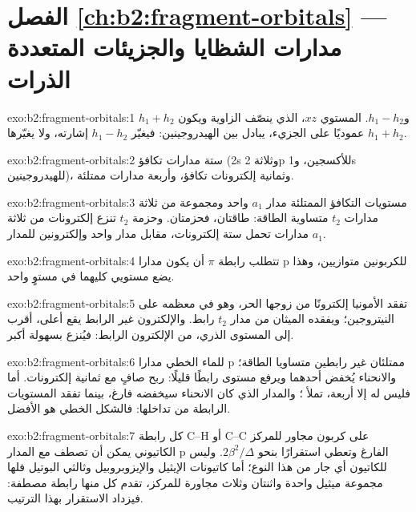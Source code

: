 \section*{الفصل \ref{ch:b2:fragment-orbitals} --- مدارات الشظايا والجزيئات المتعددة الذرات}

\begin{solution}{exo:b2:fragment-orbitals:1}
$h_1 + h_2$ و$h_1 - h_2$. المستوي $xz$، الذي ينصّف الزاوية ويكون
عموديًا على الجزيء، يبادل بين الهيدروجينين: فيغيّر $h_1 - h_2$
إشارته، ولا يغيّرها $h_1 + h_2$.
\end{solution}

\begin{solution}{exo:b2:fragment-orbitals:2}
ستة مدارات تكافؤ (2s وثلاثة 2p للأكسجين، و1s للهيدروجينين)، وثمانية إلكترونات
تكافؤ، وأربعة مدارات ممتلئة.
\end{solution}

\begin{solution}{exo:b2:fragment-orbitals:3}
مستويات التكافؤ الممتلئة مدار $a_1$ واحد ومجموعة من ثلاثة مدارات $t_2$
متساوية الطاقة: طاقتان، فحزمتان. وحزمة $t_2$ تنزع إلكترونات من ثلاثة
مدارات تحمل ستة إلكترونات، مقابل مدار واحد وإلكترونين للمدار $a_1$.
\end{solution}

\begin{solution}{exo:b2:fragment-orbitals:4}
تتطلب رابطة $\pi$ أن يكون مدارا p للكربونين متوازيين، وهذا يضع
مستويي  كليهما في مستوٍ واحد.
\end{solution}

\begin{solution}{exo:b2:fragment-orbitals:5}
تفقد الأمونيا إلكترونًا من زوجها الحر، وهو  في معظمه على
النيتروجين؛ ويفقده الميثان من مدار $t_2$ رابط. والإلكترون غير الرابط يقع أعلى،
أقرب إلى المستوى الذري، من الإلكترون الرابط: فيُنزع بسهولة أكبر.
\end{solution}

\begin{solution}{exo:b2:fragment-orbitals:6}
للماء الخطي مدارا p ممتلئان غير رابطين متساويا الطاقة؛ والانحناء يُخفض أحدهما
ويرفع مستوى رابطًا قليلًا: ربح صافٍ مع ثمانية إلكترونات. أما 
فليس له إلا أربعة، تملأ ؛ والمدار الذي كان الانحناء سيخفضه
فارغ، بينما تفقد المستويات الرابطة من تداخلها: فالشكل الخطي هو الأفضل.
\end{solution}

\begin{solution}{exo:b2:fragment-orbitals:7}
كل رابطة C--H أو C--C على كربون مجاور للمركز الكاتيوني يمكن أن تصطف مع
المدار p الفارغ وتعطي استقرارًا بنحو $2\beta^2/\Delta$. وليس للكاتيون  أي
جار من هذا النوع؛ أما كاتيونات الإيثيل والإيزوبروبيل وثالثي البوتيل فلها مجموعة ميثيل واحدة واثنتان وثلاث
مجاورة للمركز، تقدم كل منها رابطة مصطفة: فيزداد الاستقرار بهذا
الترتيب.
\end{solution}

